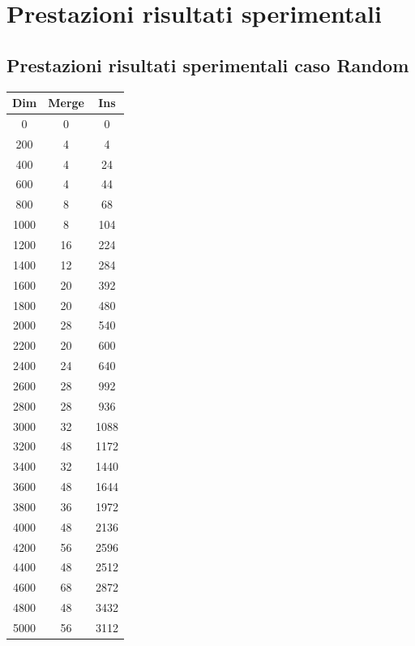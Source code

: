 \documentclass[12pt]{article}
\begin{document}
\section{Prestazioni risultati sperimentali}
\subsection{Prestazioni risultati sperimentali caso Random}
\begin{center}
 \begin{tabular}{||c  c c||} 
 \hline
 Dim & Merge  & Ins \\ [0.5ex] 
\hline
0  & 0 & 0 \\
\hline
200 & 4 & 4 \\
\hline
400 & 4 & 24 \\
\hline
600 & 4 & 44 \\
\hline
800 & 8 & 68 \\
\hline
1000 & 8 & 104 \\
\hline
1200 & 16 & 224 \\
\hline
1400 & 12 & 284 \\
\hline
1600 & 20 & 392 \\
\hline
1800 & 20 & 480 \\
\hline
2000 & 28 & 540 \\
\hline
2200 & 20 & 600 \\
\hline
2400 & 24 & 640 \\
\hline
2600 & 28 & 992 \\
\hline
2800 & 28 & 936 \\
\hline
3000 & 32 & 1088 \\
\hline
3200 & 48 & 1172 \\
\hline
3400 & 32 & 1440 \\
\hline
3600 & 48 & 1644 \\
\hline
3800 & 36 & 1972 \\
\hline
4000 & 48 & 2136 \\
\hline
4200 & 56 & 2596 \\
\hline
4400 & 48 & 2512 \\
\hline
4600 & 68 & 2872 \\
\hline
4800 & 48 & 3432 \\
\hline
5000 & 56 & 3112 \\
\hline
\end{tabular}
\end{center}
\end{document}
